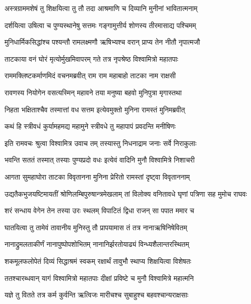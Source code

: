 \twolineshloka
{अस्त्रग्राममशेषं तु शिक्षयित्वा तु तौ तदा}
{आश्रमाणि च दिव्यानि मुनीनां भावितात्मनाम्} %

\twolineshloka
{दर्शयित्वा उषित्वा च पुण्यस्थानेषु सत्तमः}
{गङ्गामुत्तीर्य शोणस्य तीरमासाद्य पश्चिमम्} %

\twolineshloka
{मुनिधार्मिकसिद्धांश्च पश्यन्तौ रामलक्ष्मणौ}
{ऋषिभ्यश्च वरान् प्राप्य तेन नीतौ नृपात्मजौ} %

\twolineshloka
{ताटकाया वनं घोरं मृत्योर्मुखमिवापरम्}
{गते तत्र नृपश्रेष्ठ विश्वामित्रो महातपाः} %

\twolineshloka
{राममक्लिष्टकर्माणमिदं वचनमब्रवीत्}
{राम राम महाबाहो ताटका नाम राक्षसी} %

\twolineshloka
{रावणस्य नियोगेन वसत्यस्मिन् महावने}
{तया मनुष्या बहवो मुनिपुत्रा मृगास्तथा} %

\twolineshloka
{निहता भक्षिताश्चैव तस्मात्तां वध सत्तम}
{इत्येवमुक्तो मुनिना रामस्तं मुनिमब्रवीत्} %

\twolineshloka
{कथं हि स्त्रीवधं कुर्यामहमद्य महामुने}
{स्त्रीवधे तु महापापं प्रवदन्ति मनीषिणः} %

\twolineshloka
{इति रामवचः श्रुत्वा विश्वामित्र उवाच तम्}
{तस्यास्तु निधनाद्राम जनाः सर्वे निराकुलाः} %

\twolineshloka
{भवन्ति सततं तस्मात् तस्याः पुण्यप्रदो वधः}
{इत्येवं वादिनि मुनौ विश्वामित्रे निशाचरी} %

\twolineshloka
{आगता सुमहाघोरा ताटका विवृतानना}
{मुनिना प्रेरितो रामस्तां दृष्ट्वा विवृताननाम्} %

\twolineshloka
{उद्यतैकभुजयष्टिमायतीं श्रोणिलम्बिपुरुषान्त्रमेखलाम्}
{तां विलोक्य वनितावधे घृणां पत्रिणा सह मुमोच राघवः} %

\twolineshloka
{शरं सन्धाय वेगेन तेन तस्या उरः स्थलम्}
{विपाटितं द्विधा राजन् सा पपात ममार च} %

\twolineshloka
{घातयित्वा तु तामेवं तावानीय मुनिस्तु तौ}
{प्रापयामास तं तत्र नानाऋषिनिषेवितम्} %

\twolineshloka
{नानाद्रुमलताकीर्णं नानापुष्पोपशोभितम्}
{नानानिर्झरतोयाढ्यं विन्ध्यशैलान्तरस्थितम्} %

\twolineshloka
{शकमूलफलोपेतं दिव्यं सिद्धाश्रमं स्वकम्}
{रक्षार्थं तावुभौ स्थाप्य शिक्षयित्वा विशेषतः} %

\twolineshloka
{ततश्चारब्धवान् यागं विश्वामित्रो महातपाः}
{दीक्षां प्रविष्टे च मुनौ विश्वामित्रे महात्मनि} %

\twolineshloka
{यज्ञे तु वितते तत्र कर्म कुर्वन्ति ऋत्विजः}
{मारीचश्च सुबाहुश्च बहवश्चान्यराक्षसाः} %

